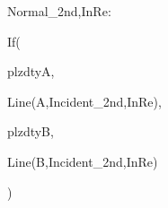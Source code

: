 Normal_{2nd,InRe}:

  If(
    
    plzdtyA,

    Line(A,Incident_{2nd,InRe}),
    
    plzdtyB,

    Line(B,Incident_{2nd,InRe})
    
    )